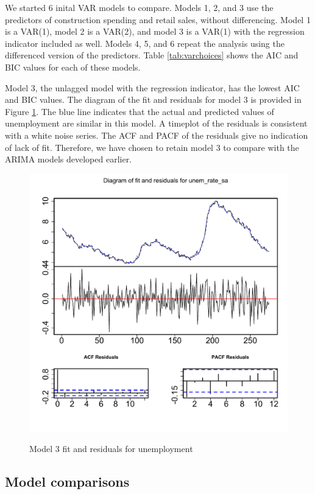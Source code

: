 \documentclass[twoside,twocolumn]{article}
\begin{document}
We started 6 inital VAR models to compare. Models 1, 2, and 3 use the predictors of construction spending and retail sales, without differencing. Model 1 is a VAR(1), model 2 is a VAR(2), and model 3 is a VAR(1) with the regression indicator included as well. Models 4, 5, and 6 repeat the analysis using the differenced version of the predictors. Table \ref{tab:varchoices} shows the AIC and BIC values for each of these models.  

Model 3, the unlagged model with the regression indicator, has the lowest AIC and BIC values.  The diagram of the fit and residuals for model 3 is provided in Figure \ref{fig:varfitmodel3}. The blue line indicates that the actual and predicted values of unemployment are similar in this model. A timeplot of the residuals is consistent with a white noise series. The ACF and PACF of the residuals give no indication of lack of fit. Therefore, we have chosen to retain model 3 to compare with the ARIMA models developed earlier. 


   \begin{figure}[htb]
    	\centering
     	\caption{Model 3 fit and residuals for unemployment}
     	\includegraphics[width=\linewidth]{images/varfitmodel3}
     	\label{fig:varfitmodel3}
 \end{figure}
 
\subsection{Model comparisons}
\end{document}
